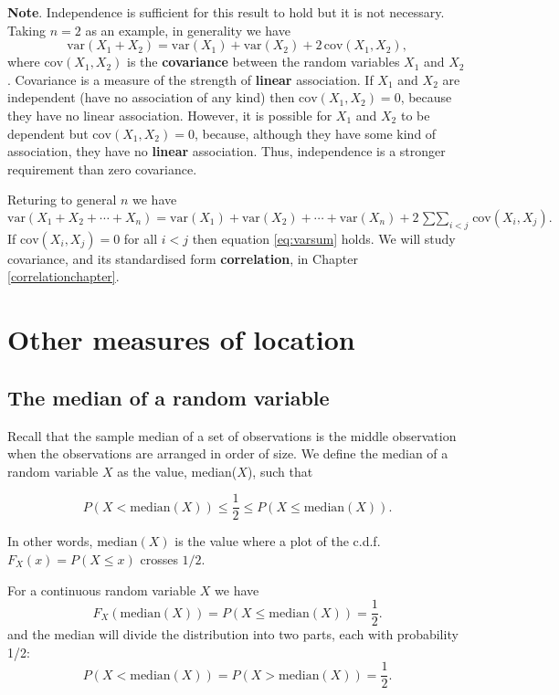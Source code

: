 \documentclass[
  11pt,
  british,
  openany, a4paper]{book}
\begin{document}
\textbf{Note}. Independence is sufficient for this result to hold but it is not necessary. Taking \(n=2\) as an example, in generality we have
\[ \mathrm{var}(X_1 + X_2) = \mathrm{var}(X_1) + \mathrm{var}(X_2) + 2\,\mathrm{cov}(X_1,X_2), \]
where \(\mathrm{cov}(X_1,X_2)\) is the \textbf{covariance} between the random variables \(X_1\) and \(X_2\). Covariance is a measure of the strength of \textbf{linear} association. If \(X_1\) and \(X_2\) are independent (have no association of any kind) then \(\mathrm{cov}(X_1,X_2)=0\), because they have no linear association. However, it is possible for \(X_1\) and \(X_2\) to be dependent but \(\mathrm{cov}(X_1,X_2)=0\), because, although they have some kind of association, they have no \textbf{linear} association. Thus, independence is a stronger requirement than zero covariance.

Returing to general \(n\) we have
\[ \mathrm{var}(X_1 + X_2 + \cdots + X_n) = \mathrm{var}(X_1) + \mathrm{var}(X_2) + \cdots + \mathrm{var}(X_n) + 2 \mathop{\sum\sum}_{i < j} \mathrm{cov}(X_i,X_j). \]
If \(\mathrm{cov}(X_i,X_j)=0\) for all \(i < j\) then equation \eqref{eq:varsum} holds. We will study covariance, and its standardised form \textbf{correlation}, in Chapter \ref{correlationchapter}.

\hypertarget{locations}{%
\section{Other measures of location}\label{locations}}

\hypertarget{the-median-of-a-random-variable}{%
\subsection{The median of a random variable}\label{the-median-of-a-random-variable}}

Recall that the sample median of a set of observations is the middle observation when the observations are arranged in order of size. We define the median of a random variable \(X\) as the value, median(\(X\)), such that

\[ P(X < \mathrm{median}(X)) \leq \frac12 \leq P(X \leq \mathrm{median}(X)). \]

In other words, \(\mathrm{median}(X)\) is the value where a plot of the c.d.f. \(F_X(x)=P(X \leq x)\) crosses \(1/2\).

For a continuous random variable \(X\) we have
\[  F_X(\mathrm{median}(X)) = P(X \leq \mathrm{median}(X)) =\frac12. \]
and the median will divide the distribution into two parts, each with probability 1/2:
\[ P(X < \mathrm{median}(X)) = P(X > \mathrm{median}(X)) = \frac12. \]
\end{document}
